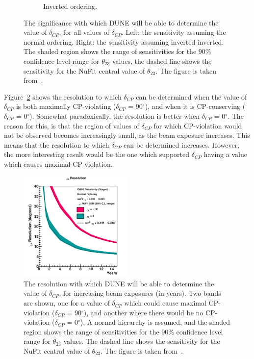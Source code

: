 \begin{figure}
\begin{subfigure}{0.49\textwidth}
    \caption{Inverted ordering.}
  \end{subfigure}
  \caption[The significance with which DUNE will be able to determine the value of $\delta_{CP}$, for all values of $\delta_{CP}$]
          {The significance with which DUNE will be able to determine the value of $\delta_{CP}$, for all values of $\delta_{CP}$. Left: the sensitivity assuming the normal ordering. Right: the sensitivity assuming inverted inverted. The shaded region shows the range of sensitivities for the 90\% confidence level range for $\theta_{23}$ values, the dashed line shows the sensitivity for the NuFit central value of $\theta_{23}$. The figure is taken from~\citep{DUNE2332}.}
  \label{fig:DUNECPViolation}
\end{figure}

Figure~\ref{fig:DUNECPViolationRes} shows the resolution to which $\delta_{CP}$ can be determined when the value of $\delta_{CP}$ is both maximally CP-violating ($\delta_{CP}$ = 90$^{\circ}$), and when it is CP-conserving ($\delta_{CP}$ = 0$^{\circ}$). Somewhat paradoxically, the resolution is better when $\delta_{CP}$ = 0$^{\circ}$. The reason for this, is that the region of values of $\delta_{CP}$ for which CP-violation would not be observed becomes increasingly small, as the beam exposure increases. This means that the resolution to which $\delta_{CP}$ can be determined increases. However, the more interesting result would be the one which supported $\delta_{CP}$ having a value which causes maximal CP-violation. \\

\begin{figure}
  \centering
  \includegraphics[width=0.5\textwidth]{resdcp_exp_staging_th23band_2017}
  \caption[The resolution with which DUNE will be able to determine the value of $\delta_{CP}$, for increasing beam exposures]
          {The resolution with which DUNE will be able to determine the value of $\delta_{CP}$, for increasing beam exposures (in years). Two bands are shown, one for a value of $\delta_{CP}$ which could cause maximal CP-violation ($\delta_{CP}$ = 90$^{\circ}$), and another where there would be no CP-violation ($\delta_{CP}$ = 0$^{\circ}$). A normal hierarchy is assumed, and the shaded region shows the range of sensitivities for the 90\% confidence level range for $\theta_{23}$ values. The dashed line shows the sensitivity for the NuFit central value of $\theta_{23}$. The figure is taken from~\citep{DUNE2377}.}
  \label{fig:DUNECPViolationRes}
\end{figure}

